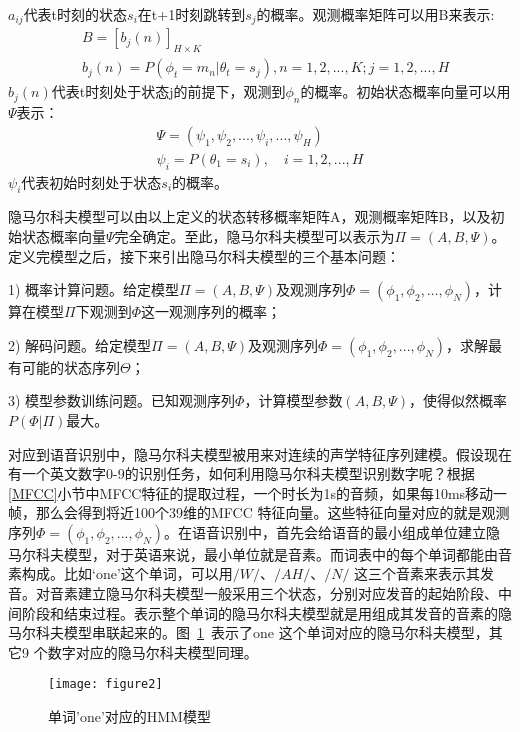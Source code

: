 $a_{ij}$代表t时刻的状态$s_i$在t+1时刻跳转到$s_j$的概率。观测概率矩阵可以用B来表示:
\begin{eqnarray}
  &B=[b_j(n)]_{H\times K} \\
  &b_j(n) = P(\phi_t=m_n | \theta_t=s_j), n=1,2,...,K; j=1,2,...,H
\end{eqnarray}
$b_j(n)$代表t时刻处于状态j的前提下，观测到$\phi_n$的概率。初始状态概率向量可以用$\Psi$表示：
\begin{eqnarray}
  \Psi=(\psi_1,\psi_2,...,\psi_i,...,\psi_H) \\
  \psi_i = P(\theta_1=s_i), \quad i=1,2,...,H
\end{eqnarray}
$\psi_i$代表初始时刻处于状态$s_i$的概率。

隐马尔科夫模型可以由以上定义的状态转移概率矩阵A，观测概率矩阵B，以及初始状态概率向量$\Psi$完全确定。至此，隐马尔科夫模型可以表示为$\Pi=(A,B,\Psi)$。定义完模型之后，接下来引出隐马尔科夫模型的三个基本问题：

1) 概率计算问题。给定模型$\Pi=(A,B,\Psi)$及观测序列$\Phi=(\phi_1,\phi_2,...,\phi_N)$，计算在模型$\Pi$下观测到$\Phi$这一观测序列的概率；

2) 解码问题。给定模型$\Pi=(A,B,\Psi)$及观测序列$\Phi=(\phi_1,\phi_2,...,\phi_N)$，求解最有可能的状态序列$\Theta$；

3) 模型参数训练问题。已知观测序列$\Phi$，计算模型参数$(A,B,\Psi)$，使得似然概率$P(\Phi|\Pi)$最大。

对应到语音识别中，隐马尔科夫模型被用来对连续的声学特征序列建模。假设现在有一个英文数字0-9的识别任务，如何利用隐马尔科夫模型识别数字呢？根据\ref{MFCC}小节中MFCC特征的提取过程，一个时长为1s的音频，如果每10ms移动一帧，那么会得到将近100个39维的MFCC 特征向量。这些特征向量对应的就是观测序列$\Phi=(\phi_1,\phi_2,...,\phi_N)$。在语音识别中，首先会给语音的最小组成单位建立隐马尔科夫模型，对于英语来说，最小单位就是音素。而词表中的每个单词都能由音素构成。比如‘one’这个单词，可以用$/W/$、$/AH/$、$/N/$ 这三个音素来表示其发音。对音素建立隐马尔科夫模型一般采用三个状态，分别对应发音的起始阶段、中间阶段和结束过程。表示整个单词的隐马尔科夫模型就是用组成其发音的音素的隐马尔科夫模型串联起来的。图~\ref{fig:figure2}~表示了one 这个单词对应的隐马尔科夫模型，其它9 个数字对应的隐马尔科夫模型同理。
\begin{figure}[htbp]
\centering
\texttt{[image: figure2]}
\caption{单词'one'对应的HMM模型}\label{fig:figure2}
\vspace{\baselineskip}
\end{figure}

